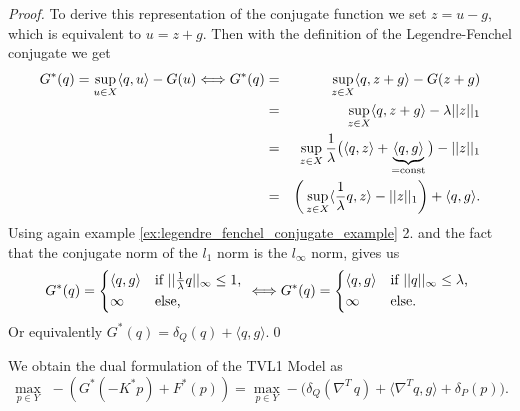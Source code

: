             \begin{proof}
                To derive this representation of the conjugate function we set $z = u - g$, which is equivalent to $u = z + g$. Then with the definition of the Legendre-Fenchel conjugate we get
                    \begin{eqnarray}
                        G^{\ast}(q) = \sup_{u \in X} \langle q, u \rangle - G(u) \Longleftrightarrow G^{\ast}(q) &=& \sup_{z \in X} \langle q, z + g \rangle - G(z + g) \notag \\
                        &=& \sup_{z \in X} \langle q, z + g \rangle - \lambda ||z||_{1} \notag \\
                        &=& \sup_{z \in X} \frac{1}{\lambda} \big(\langle q, z \rangle + \underbrace{\langle q, g \rangle}_{= \textnormal{const}} \big) - ||z||_{1} \notag \\
                        &=& \bigg(\sup_{z \in X} \langle \frac{1}{\lambda} q, z \rangle - ||z||_{1} \bigg) + \langle q, g \rangle.
                    \end{eqnarray}
                Using again example \ref{ex:legendre_fenchel_conjugate_example} 2. and the fact that the conjugate norm of the $l_{1}$ norm is the $l_{\infty}$ norm, gives us
                    $$
                        G^{\ast}(q) =
                            \begin{dcases*}
                                \langle q, g \rangle & \textnormal{if $||\frac{1}{\lambda}q||_{\infty} \le 1$,} \\
                                \infty & \textnormal{else},
                            \end{dcases*} \Longleftrightarrow
                        G^{\ast}(q) =
                            \begin{dcases*}
                                \langle q, g \rangle & \textnormal{if $||q||_{\infty} \le \lambda$,} \\
                                \infty & \textnormal{else}.
                            \end{dcases*}
                    $$
                Or equivalently $G^{\ast}(q) = \delta_{Q}(q) + \langle q, g \rangle$.\qed
            \end{proof}
        We obtain the dual formulation of the TVL1 Model as
            \begin{equation}
                \max_{p \in Y}\,\, -(G^{\ast}(-K^{\ast}p) + F^{\ast}(p)) = \max_{p \in Y} -\bigg( \delta_{Q}(\nabla^{T}\,q) + \langle \nabla^{T}q, g \rangle + \delta_{P}(p) \bigg).
            \label{eq:dual_tvl1_problem}
            \end{equation}
    
